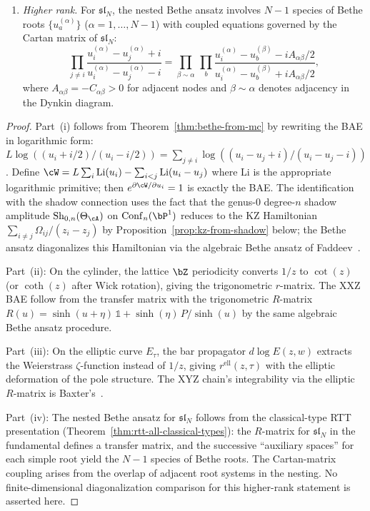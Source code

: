 \begin{theorem}
\begin{enumerate}[label=\textup{(\roman*)}]
\item \emph{Higher rank.}
 For $\mathfrak{sl}_N$, the nested Bethe ansatz involves
 $N - 1$ species of Bethe roots $\{u_a^{(\alpha)}\}$
 ($\alpha = 1, \ldots, N{-}1$) with coupled equations
 governed by the Cartan matrix of $\mathfrak{sl}_N$:
 \begin{equation}\label{eq:nested-bae}
 \prod_{j \neq i}
 \frac{u_i^{(\alpha)} - u_j^{(\alpha)} + i}
 {u_i^{(\alpha)} - u_j^{(\alpha)} - i}
 = \prod_{\beta \sim \alpha}\,
 \prod_{b}
 \frac{u_i^{(\alpha)} - u_b^{(\beta)} - iA_{\alpha\beta}/2}
 {u_i^{(\alpha)} - u_b^{(\beta)} + iA_{\alpha\beta}/2},
 \end{equation}
 where \(A_{\alpha\beta}=-C_{\alpha\beta}>0\) for adjacent nodes
 and $\beta \sim \alpha$ denotes adjacency in the Dynkin diagram.
\end{enumerate}
\end{theorem}

\begin{proof}
Part~(i) follows from Theorem~\ref{thm:bethe-from-mc} by
rewriting the BAE in logarithmic form:
$L\log((u_i + i/2)/(u_i - i/2))
= \sum_{j \neq i} \log((u_i - u_j + i)/(u_i - u_j - i))$.
Define $\cW = L \sum_i \mathrm{Li}(u_i) - \sum_{i<j} \mathrm{Li}(u_i - u_j)$
where $\mathrm{Li}$ is the appropriate logarithmic primitive;
then $e^{\partial \cW/\partial u_i} = 1$ is exactly the BAE.
The identification with the shadow connection uses the fact that
the genus-$0$ degree-$n$ shadow amplitude
$\mathrm{Sh}_{0,n}(\Theta_\cA)$ on $\operatorname{Conf}_n(\bP^1)$
reduces to the KZ Hamiltonian
$\sum_{i \neq j} \Omega_{ij}/(z_i - z_j)$
by Proposition~\ref{prop:kz-from-shadow} below;
the Bethe ansatz diagonalizes this Hamiltonian via the
algebraic Bethe ansatz of Faddeev~\cite{Faddeev96}.

Part~(ii): On the cylinder, the lattice $\bZ$ periodicity converts
$1/z$ to $\cot(z)$ (or $\coth(z)$ after Wick rotation), giving the
trigonometric $r$-matrix. The XXZ BAE follow from the transfer matrix
with the trigonometric $R$-matrix $R(u) = \sinh(u + \eta)\,\mathbb{1}
+ \sinh(\eta)\,P/\sinh(u)$ by the same algebraic Bethe ansatz procedure.

Part~(iii): On the elliptic curve $E_\tau$, the bar propagator
$d\log E(z,w)$ extracts the Weierstrass $\zeta$-function instead of
$1/z$, giving $r^{\mathrm{ell}}(z,\tau)$ with the elliptic
deformation of the pole structure. The XYZ chain's
integrability via the elliptic $R$-matrix is
Baxter's~\cite{Baxter82}.

Part~(iv): The nested Bethe ansatz for $\mathfrak{sl}_N$ follows
from the classical-type RTT presentation
(Theorem~\ref{thm:rtt-all-classical-types}): the $R$-matrix for
$\mathfrak{sl}_N$ in the fundamental defines a transfer matrix,
and the successive ``auxiliary spaces'' for each simple root yield
the $N - 1$ species of Bethe roots. The Cartan-matrix coupling
arises from the overlap of adjacent root systems in the nesting.
No finite-dimensional diagonalization comparison for this higher-rank
statement is asserted here.
\end{proof}


